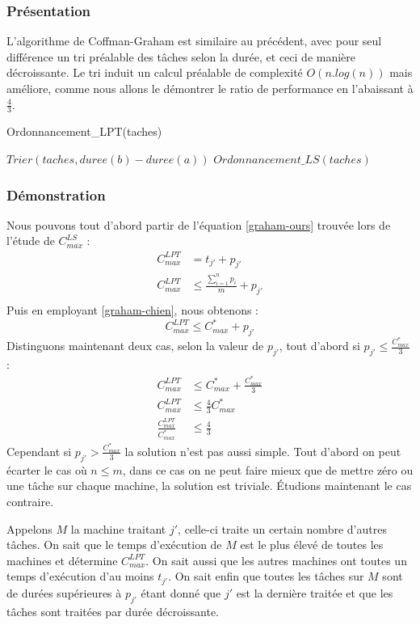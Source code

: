 \subsubsection{Présentation}
L'algorithme de Coffman-Graham est similaire au précédent, avec pour seul 
différence un tri préalable des tâches selon la durée, et ceci de manière 
décroissante. Le tri induit un calcul préalable de complexité $O(n.log(n))$ mais 
améliore, comme nous allons le démontrer le ratio de performance en l'abaissant 
à $\frac{4}{3}$.
\begin{algorithm}
\caption{Ordonnancement\_LPT(taches)}
\begin{algorithmic}
\STATE $Trier(taches, duree(b)-duree(a))$
\STATE $Ordonnancement\_LS(taches)$
\end{algorithmic}
\end{algorithm}
\subsubsection{Démonstration}
Nous pouvons tout d'abord partir de l'équation \eqref{graham-ours} trouvée lors 
de l'étude de $C^{LS}_{max}$ :
\begin{align}
C^{LPT}_{max} &= t_{j'} + p_{j'} \\
C^{LPT}_{max} &\leq \frac{\sum_{i=1}^n p_{i}}{m} + p_{j'} \\
\end{align}
Puis en employant \eqref{graham-chien}, nous obtenons :
\begin{equation}
C^{LPT}_{max} \leq C^*_{max} + p_{j'}
\end{equation}
Distinguons maintenant deux cas, selon la valeur de $p_{j'}$, tout d'abord si 
$p_{j'} \leq \frac{C^*_{max}}{3}$ :
\begin{align}
C^{LPT}_{max} &\leq C^*_{max} + \frac{C^*_{max}}{3} \\
C^{LPT}_{max} &\leq \frac{4}{3} C^*_{max} \\
\frac{C^{LPT}_{max}}{C^*_{max}} &\leq \frac{4}{3}
\end{align}
Cependant si $p_{j'} > \frac{C^*_{max}}{3}$ la solution n'est pas aussi simple.  
Tout d'abord on peut écarter le cas où $n\leq m$, dans ce cas on ne peut faire 
mieux que de mettre zéro ou une tâche sur chaque machine, la solution est 
triviale. Étudions maintenant le cas contraire.

Appelons $M$ la machine traitant $j'$, celle-ci traite un certain nombre 
d'autres tâches. On sait que le temps d'exécution de $M$ est le plus élevé de 
toutes les machines et détermine $C^{LPT}_{max}$. On sait aussi que les autres 
machines ont toutes un temps d'exécution d'au moins $t_{j'}$. On sait enfin que  
toutes les tâches sur $M$ sont de durées supérieures à $p_{j'}$ étant donné que 
$j'$ est la dernière traitée et que les tâches sont traitées par durée 
décroissante.

